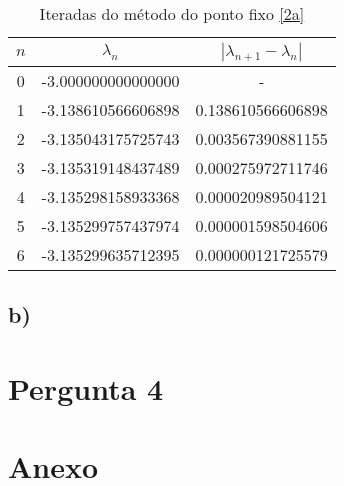 \documentclass[a4paper, 12pt]{article}
\begin{document}
	\begin{table}[H]
		\setlength{\tabcolsep}{0.5cm} %
		\renewcommand{\arraystretch}{1.5} %
		\centering
		\caption{Iteradas do método do ponto fixo \eqref{2a}}
		\label{}
		\begin{tabular}{|c|c|c|}
			$n$ & $\lambda _n$ &  $| \lambda _{n+1} - \lambda _n |$ \\\hline
			0& -3.000000000000000 & -  \\
			1& -3.138610566606898 & 0.138610566606898 \\
			2& -3.135043175725743 & 0.003567390881155 \\
			3& -3.135319148437489 & 0.000275972711746 \\
			4& -3.135298158933368 & 0.000020989504121 \\
			5& -3.135299757437974 & 0.000001598504606 \\
			6& -3.135299635712395 & 0.000000121725579 \\
		\end{tabular}
	\end{table}

\subsection*{b)}

\section{Pergunta 4}

\section{Anexo}
\end{document}

